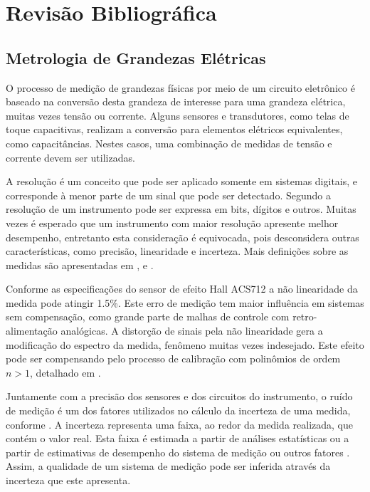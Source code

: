 \chapter{Revisão Bibliográfica}\label{cap:revbib}

	\section{Metrologia de Grandezas Elétricas}\label{sec:revbib:metrologia}

		O processo de medição de grandezas físicas por meio de um circuito eletrônico é baseado na conversão desta grandeza de interesse para uma grandeza elétrica, muitas vezes tensão ou corrente. Alguns sensores e transdutores, como telas de toque capacitivas, realizam a conversão para elementos elétricos equivalentes, como capacitâncias. Nestes casos, uma combinação de medidas de tensão e corrente devem ser utilizadas.

		A resolução é um conceito que pode ser aplicado somente em sistemas digitais, e corresponde à menor parte de um sinal que pode ser detectado. Segundo \textcite{spoonkillerwiki} a resolução de um instrumento pode ser expressa em bits, dígitos e outros. Muitas vezes é esperado que um instrumento com maior resolução apresente melhor desempenho, entretanto esta consideração é equivocada, pois desconsidera outras características, como precisão, linearidade e incerteza. Mais definições sobre as medidas são apresentadas em \cite[][p.16]{spoonkillerwiki}, \cite[][p.16]{npl132} e \cite[][p.4]{spoonkillerwiki}.

		Conforme as especificações do sensor de efeito Hall ACS712 \cite{spoonkillerwiki} a não linearidade da medida pode atingir 1.5\%. Este erro de medição tem maior influência em sistemas sem compensação, como grande parte de malhas de controle com retro-alimentação analógicas. A distorção de sinais pela não linearidade gera a modificação do espectro da medida, fenômeno muitas vezes indesejado. Este efeito pode ser compensando pelo processo de calibração com polinômios de ordem $n > 1$, detalhado em \cite{spoonkillerwiki}.

		Juntamente com a precisão dos sensores e dos circuitos do instrumento, o ruído de medição é um dos fatores utilizados no cálculo da incerteza de uma medida, conforme \cite[][p.4]{spoonkillerwiki}. A incerteza representa uma faixa, ao redor da medida realizada, que contém o valor real. Esta faixa é estimada a partir de análises estatísticas ou a partir de estimativas de desempenho do sistema de medição ou outros fatores \cite[][p.25]{npl132}. Assim, a qualidade de um sistema de medição pode ser inferida através da incerteza que este apresenta.


